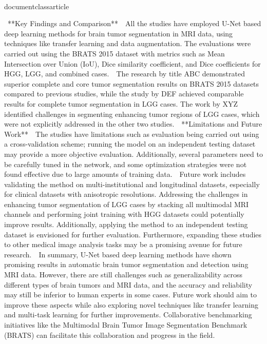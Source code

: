 \\documentclass{article}
\begin{document}
\
**Key Findings and Comparison**\
\
All the studies have employed U-Net based deep learning methods for brain tumor segmentation in MRI data, using techniques like transfer learning and data augmentation. The evaluations were carried out using the BRATS 2015 dataset with metrics such as Mean Intersection over Union (IoU), Dice similarity coefficient, and Dice coefficients for HGG, LGG, and combined cases.\
\
The research by title ABC demonstrated superior complete and core tumor segmentation results on BRATS 2015 datasets compared to previous studies, while the study by DEF achieved comparable results for complete tumor segmentation in LGG cases. The work by XYZ identified challenges in segmenting enhancing tumor regions of LGG cases, which were not explicitly addressed in the other two studies.\
\
**Limitations and Future Work**\
\
The studies have limitations such as evaluation being carried out using a cross-validation scheme; running the model on an independent testing dataset may provide a more objective evaluation. Additionally, several parameters need to be carefully tuned in the network, and some optimization strategies were not found effective due to large amounts of training data.\
\
Future work includes validating the method on multi-institutional and longitudinal datasets, especially for clinical datasets with anisotropic resolutions. Addressing the challenges in enhancing tumor segmentation of LGG cases by stacking all multimodal MRI channels and performing joint training with HGG datasets could potentially improve results. Additionally, applying the method to an independent testing dataset is envisioned for further evaluation. Furthermore, expanding these studies to other medical image analysis tasks may be a promising avenue for future research.\
\
In summary, U-Net based deep learning methods have shown promising results in automatic brain tumor segmentation and detection using MRI data. However, there are still challenges such as generalizability across different types of brain tumors and MRI data, and the accuracy and reliability may still be inferior to human experts in some cases. Future work should aim to improve these aspects while also exploring novel techniques like transfer learning and multi-task learning for further improvements. Collaborative benchmarking initiatives like the Multimodal Brain Tumor Image Segmentation Benchmark (BRATS) can facilitate this collaboration and progress in the field.
\end{document}
